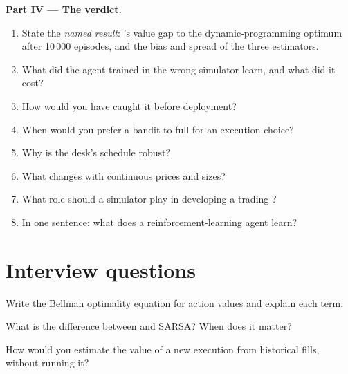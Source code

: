 \begin{problem}
\medskip\noindent\textbf{Part IV --- The verdict.}
\begin{enumerate}[resume]
\item State the \emph{named result}: 's value gap to the dynamic-programming optimum after 10\,000 episodes, and the
bias and spread of the three  estimators.
\item What did the agent trained in the wrong simulator learn, and what did it cost?
\item How would you have caught it before deployment?
\item When would you prefer a bandit to full  for an execution choice?
\item Why is the desk's schedule robust?
\item What changes with continuous prices and sizes?
\item What role should a simulator play in developing a trading ?
\item In one sentence: what does a reinforcement-learning agent learn?
\end{enumerate}
\end{problem}

\section{Interview questions}

\begin{interviewq}\label{iq:ml:reinforcement-learning-foundations:1}
Write the Bellman optimality equation for action values and explain each term.
\end{interviewq}

\begin{interviewq}\label{iq:ml:reinforcement-learning-foundations:2}
What is the difference between  and SARSA? When does it matter?
\end{interviewq}

\begin{interviewq}\label{iq:ml:reinforcement-learning-foundations:3}
How would you estimate the value of a new execution  from historical fills, without running it?
\end{interviewq}

